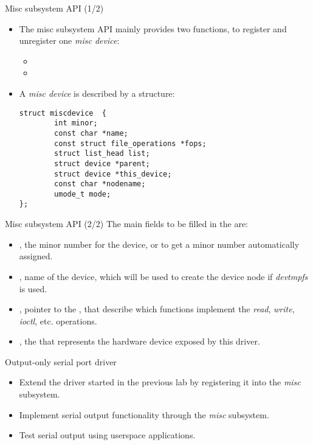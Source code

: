\begin{frame}[fragile]{Misc subsystem API (1/2)}
  \begin{itemize}
  \item The misc subsystem API mainly provides two functions, to
    register and unregister one {\em misc device}:
    \begin{itemize}
    \item {}
    \item {}
    \end{itemize}
  \item A {\em misc device} is described by a 
    structure:
    \begin{verbatim}
struct miscdevice  {
        int minor;
        const char *name;
        const struct file_operations *fops;
        struct list_head list;
        struct device *parent;
        struct device *this_device;
        const char *nodename;
        umode_t mode;
};
\end{verbatim}
  \end{itemize}
\end{frame}

\begin{frame}[fragile]{Misc subsystem API (2/2)}
  The main fields to be filled in the  are:
  \begin{itemize}
  \item {}, the minor number for the device, or
     to get a minor number automatically
    assigned.
  \item {}, name of the device, which will be used to create
    the device node if {\em devtmpfs} is used.
  \item {}, pointer to the , that
    describe which functions implement the {\em read}, {\em write},
    {\em ioctl}, etc. operations.
  \item {}, the  that represents the
    hardware device exposed by this driver.
  \end{itemize}
\end{frame}

\setuplabframe
{Output-only serial port driver}
{
  \begin{itemize}
  \item Extend the driver started in the previous lab by registering
    it into the {\em misc} subsystem.
  \item Implement serial output functionality through the {\em misc}
    subsystem.
  \item Test serial output using userspace applications.
  \end{itemize}
}
